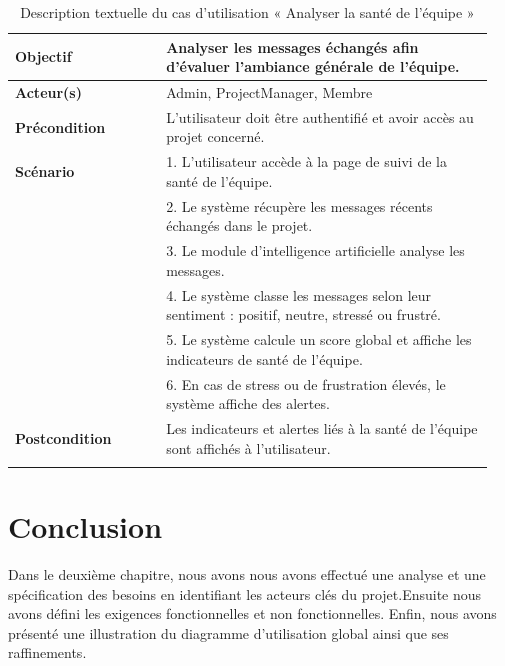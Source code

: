 \begin{longtable}[c]{|p{0.3\linewidth}|p{0.65\linewidth}|}
  \textbf{Objectif}      & Analyser les messages échangés afin d'évaluer l'ambiance générale de l'équipe.                \\
  \hline
  \textbf{Acteur(s)}     & Admin, ProjectManager, Membre                                                                        \\
  \hline
  \textbf{Précondition}  & L'utilisateur doit être authentifié et avoir accès au projet concerné.                        \\
  \hline
  \textbf{Scénario}      &
  1. L'utilisateur accède à la page de suivi de la santé de l'équipe.                                                    \\
                         & 2. Le système récupère les messages récents échangés dans le projet.                          \\
                         & 3. Le module d'intelligence artificielle analyse les messages.                                \\
                         & 4. Le système classe les messages selon leur sentiment : positif, neutre, stressé ou frustré. \\
                         & 5. Le système calcule un score global et affiche les indicateurs de santé de l'équipe.        \\
                         & 6. En cas de stress ou de frustration élevés, le système affiche des alertes.                 \\
  \hline
  \textbf{Postcondition} & Les indicateurs et alertes liés à la santé de l'équipe sont affichés à l'utilisateur.         \\
  \hline
  \caption{\centering Description textuelle du cas d'utilisation « Analyser la santé de l'équipe »}
\end{longtable}


\section*{Conclusion}


Dans le deuxième chapitre, nous avons nous avons effectué une analyse et une spécification des besoins en identifiant les acteurs clés du projet.Ensuite nous avons défini les exigences fonctionnelles et non fonctionnelles. Enfin, nous avons présenté une illustration du diagramme d'utilisation global ainsi que ses raffinements.
